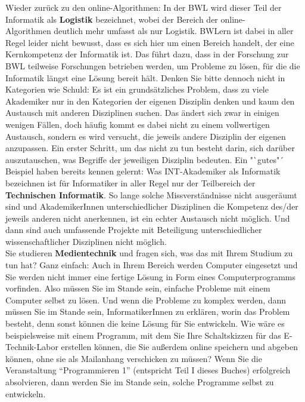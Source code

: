 Wieder zurück zu den online-Algorithmen: In der BWL wird dieser Teil der Informatik als \textbf{Logistik} bezeichnet, wobei der Bereich der online-\\
Algorithmen deutlich mehr umfasst als nur Logistik. BWLern ist dabei in aller Regel leider nicht bewusst, dass es sich hier um einen Bereich handelt, der eine Kernkompetenz der Informatik ist. Das führt dazu, dass in der Forschung zur BWL teilweise Forschungen betrieben werden, um Probleme zu lösen, für die die Informatik längst eine Lösung bereit hält. Denken Sie bitte dennoch nicht in Kategorien wie Schuld: Es ist ein grundsätzliches Problem, dass zu viele Akademiker nur in den Kategorien der eigenen Disziplin denken und kaum den Austausch mit anderen Disziplinen suchen. Das ändert sich zwar in einigen wenigen Fällen, doch häufig kommt es dabei nicht zu einem vollwertigen Austausch, sondern es wird versucht, die jeweils andere Disziplin der eigenen anzupassen. Ein erster Schritt, um das nicht zu tun besteht darin, sich darüber auszutauschen, was Begriffe der jeweiligen Disziplin bedeuten. Ein "`gutes"´ Beispiel haben bereits kennen gelernt: Was INT-Akademiker als Informatik bezeichnen ist für Informatiker in aller Regel nur der Teilbereich der \textbf{Technischen Informatik}. So lange solche Missverständnisse nicht ausgeräumt sind und AkademikerInnen unterschiedlicher Disziplinen die Kompetenz des/der jeweils anderen nicht anerkennen, ist ein echter Austausch nicht möglich. Und dann sind auch umfassende Projekte mit Beteiligung unterschiedlicher wissenschaftlicher Disziplinen nicht möglich.\\
 
Sie studieren \textbf{Medientechnik} und fragen sich, was das mit Ihrem Studium zu tun hat? Ganz einfach: Auch in Ihrem Bereich werden Computer eingesetzt und Sie werden nicht immer eine fertige Lösung in Form eines Computerprogramms vorfinden. Also müssen Sie im Stande sein, einfache Probleme mit einem Computer selbst zu lösen. Und wenn die Probleme zu komplex werden, dann müssen Sie im Stande sein, InformatikerInnen zu erklären, worin das Problem besteht, denn sonst können die keine Lösung für Sie entwickeln. Wie wäre es beispielsweise mit einem Programm, mit dem Sie Ihre Schaltskizzen für das E-Technik-Labor erstellen können, die Sie außerdem online speichern und abgeben können, ohne sie als Mailanhang verschicken zu müssen? Wenn Sie die Veranstaltung "`Programmieren 1"' (entspricht Teil I dieses Buches) erfolgreich absolvieren, dann werden Sie im Stande sein, solche Programme selbst zu entwickeln.\\

